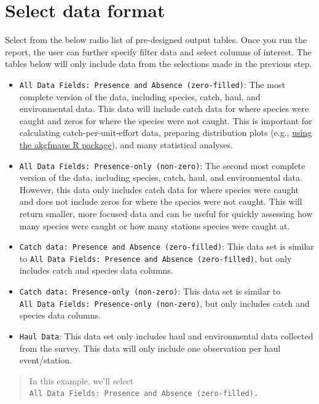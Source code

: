\documentclass[
  letterpaper,
  oneside,
  open=any]{scrbook}
\providecommand{\tightlist}{%
  \setlength{\itemsep}{0pt}\setlength{\parskip}{0pt}}\usepackage{longtable,booktabs,array}
\begin{document}
\hypertarget{select-data-format}{%
\section{Select data format}\label{select-data-format}}

Select from the below radio list of pre-designed output tables. Once you
run the report, the user can further specify filter data and select
columns of interest. The tables below will only include data from the
selections made in the previous step.

\begin{itemize}
\tightlist
\item
  \texttt{All\ Data\ Fields:\ Presence\ and\ Absence\ (zero-filled)}:
  The most complete version of the data, including species, catch, haul,
  and environmental data. This data will include catch data for where
  species were caught and zeros for where the species were not caught.
  This is important for calculating catch-per-unit-effort data,
  preparing distribution plots (e.g.,
  \href{https://github.com/afsc-gap-products/akgfmaps}{using the
  akgfmaps R package}), and many statistical analyses.
\item
  \texttt{All\ Data\ Fields:\ Presence-only\ (non-zero)}: The second
  most complete version of the data, including species, catch, haul, and
  environmental data. However, this data only includes catch data for
  where species were caught and does not include zeros for where the
  species were not caught. This will return smaller, more focused data
  and can be useful for quickly assessing how many species were caught
  or how many stations species were caught at.
\item
  \texttt{Catch\ data:\ Presence\ and\ Absence\ (zero-filled)}: This
  data set is similar to
  \texttt{All\ Data\ Fields:\ Presence\ and\ Absence\ (zero-filled)},
  but only includes catch and species data columns.
\item
  \texttt{Catch\ data:\ Presence-only\ (non-zero)}: This data set is
  similar to \texttt{All\ Data\ Fields:\ Presence-only\ (non-zero)}, but
  only includes catch and species data columns.
\item
  \texttt{Haul\ Data}: This data set only includes haul and
  environmental data collected from the survey. This data will only
  include one observation per haul event/station.
\end{itemize}

\begin{quote}
In this example, we'll select
\texttt{All\ Data\ Fields:\ Presence\ and\ Absence\ (zero-filled).}
\end{quote}
\end{document}
